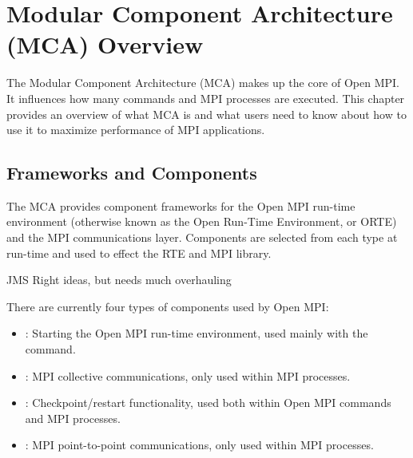 %
% 
% 
%

\chapter{Modular Component Architecture (MCA) Overview}
\label{sec:mca}

The Modular Component Architecture (MCA) makes up the core of Open MPI.
It influences how many commands and MPI processes are executed.  This
chapter provides an overview of what MCA is and what users need to
know about how to use it to maximize performance of MPI applications.


\section{Frameworks and Components}

The MCA provides component frameworks for the Open MPI run-time
environment (otherwise known as the Open Run-Time Environment, or
ORTE) and the MPI communications layer.  Components are selected from
each type at run-time and used to effect the RTE and MPI library.

{\Huge JMS Right ideas, but needs much overhauling}

There are currently four types of components used by
Open MPI:

\begin{itemize}
\item {}: Starting the Open MPI run-time environment, used mainly
  with the  command.

\item {}: MPI collective communications, only used within MPI
  processes.

\item {}: Checkpoint/restart functionality, used both within
  Open MPI commands and MPI processes.

\item {}: MPI point-to-point communications, only used within
  MPI processes.  
\end{itemize}


